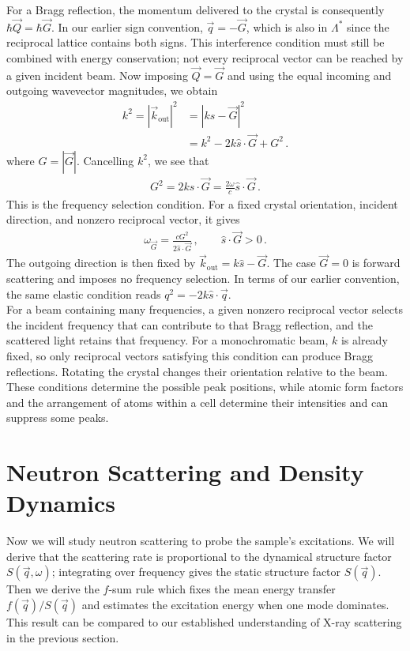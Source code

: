 \documentclass[11pt, oneside]{book}
\theoremstyle{break}
\theoremstyle{break}
\begin{document}
For a Bragg reflection, the momentum delivered to the crystal is consequently $\hbar\vec{Q}=\hbar\vec{G}$. In our earlier sign convention, $\vec{q}=-\vec{G}$, which is also in $\Lambda^*$ since the reciprocal lattice contains both signs. This interference condition must still be combined with energy conservation; not every reciprocal vector can be reached by a given incident beam. Now imposing $\vec{Q}=\vec{G}$ and using the equal incoming and outgoing wavevector magnitudes, we obtain
\begin{align*}
k^2=|\vec{k}_{\text{out}}|^2
&=|k\hat{s}-\vec{G}|^2\\
&=k^2-2k\hat{s}\cdot\vec{G}+G^2\,.
\end{align*}
where $G=|\vec{G}|$. Cancelling $k^2$, we see that
\begin{align*}
G^2=2k\hat{s}\cdot\vec{G}
=\frac{2\omega}{c}\hat{s}\cdot\vec{G}\,.
\end{align*}
This is the frequency selection condition. For a fixed crystal orientation, incident direction, and nonzero reciprocal vector, it gives
\begin{align*}
\omega_{\vec{G}}=\frac{cG^2}{2\hat{s}\cdot\vec{G}}\,,
\qquad \hat{s}\cdot\vec{G}>0\,.
\end{align*}
The outgoing direction is then fixed by $\vec{k}_{\text{out}}=k\hat{s}-\vec{G}$. The case $\vec{G}=0$ is forward scattering and imposes no frequency selection. In terms of our earlier convention, the same elastic condition reads $q^2=-2k\hat{s}\cdot\vec{q}$. \\

For a beam containing many frequencies, a given nonzero reciprocal vector selects the incident frequency that can contribute to that Bragg reflection, and the scattered light retains that frequency. For a monochromatic beam, $k$ is already fixed, so only reciprocal vectors satisfying this condition can produce Bragg reflections. Rotating the crystal changes their orientation relative to the beam. These conditions determine the possible peak positions, while atomic form factors and the arrangement of atoms within a cell determine their intensities and can suppress some peaks. \\


\section{Neutron Scattering and Density Dynamics}
Now we will study neutron scattering to probe the sample's excitations. We will derive that the scattering rate is proportional to the dynamical structure factor $S(\vec{q},\omega)$; integrating over frequency gives the static structure factor $S(\vec{q})$. Then we derive the $f$-sum rule which fixes the mean energy transfer $f(\vec{q})/S(\vec{q})$ and estimates the excitation energy when one mode dominates. This result can be compared to our established understanding of X-ray scattering in the previous section. \\
\end{document}
